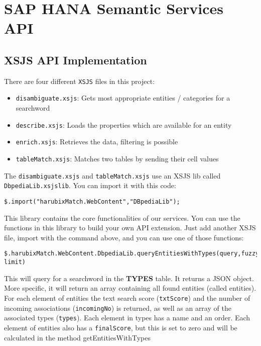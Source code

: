 \chapter{SAP HANA Semantic Services API} \label{appendix:appendixF}

\section{XSJS API Implementation}
\label{section:xsjsAPI}

There are four different \texttt{XSJS} files in this project:

\begin{itemize}
	\item \texttt{disambiguate.xsjs}: Gets most appropriate entities / categories for a searchword
	\item \texttt{describe.xsjs}: Loads the properties which are available for an entity
	\item \texttt{enrich.xsjs}: Retrieves the data, filtering is possible \item \texttt{tableMatch.xsjs}: Matches two tables by sending their cell values
\end{itemize}

The \texttt{disambiguate.xsjs} and \texttt{tableMatch.xsjs} use an XSJS lib called \\\texttt{DbpediaLib.xsjslib}. You can import it with this code:

\begin{verbatim}
$.import("harubixMatch.WebContent","DBpediaLib");
\end{verbatim}

This library contains the core functionalities of our services. You can use the functions in this library to build your own API extension. Just add another XSJS file, import with the command above, and you can use one of those functions:

\scriptsize
\begin{verbatim}
$.harubixMatch.WebContent.DbpediaLib.queryEntitiesWithTypes(query,fuzzyStr, limit)
\end{verbatim}
\normalsize

This will query for a searchword in the \textbf{TYPES} table. It returns a JSON object. More specific, it will return an array containing all found entities (called entities). For each element of entities the text search score (\texttt{txtScore}) and the number of incoming associations (\texttt{incomingNo}) is returned, as well as an array of the associated types (\texttt{types}). Each element in types has a name and an order. Each element of entities also has a \texttt{finalScore}, but this is set to zero and will be calculated in the method getEntitiesWithTypes

